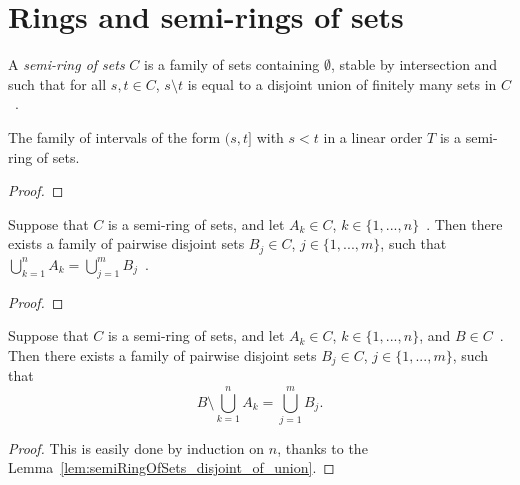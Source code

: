 \section{Rings and semi-rings of sets}

\begin{definition}\label{def:semiRingOfSets}
  \mathlibok
  A \emph{semi-ring of sets} $C$ is a family of sets containing $\emptyset$,
  stable by intersection and such that for all $s, t \in C$,
  $s \setminus t$ is equal to a disjoint union of finitely many sets in $C$~.
\end{definition}

\begin{lemma}\label{lem:semiRingOfSets_of_intervals}
  \mathlibok
  The family of intervals of the form $(s, t]$
  with $s < t$ in a linear order $T$ is a semi-ring of sets.
\end{lemma}

\begin{proof}\leanok
\end{proof}

\begin{lemma}\label{lem:semiRingOfSets_disjoint_of_union}
  \mathlibok
  Suppose that $C$ is a semi-ring of sets, and let $A_k \in C$, $k \in \{1, ..., n\}$~.
  Then there exists a family of pairwise disjoint sets $B_j \in C$, $j \in \{1, ..., m\}$,
  such that $\bigcup_{k=1}^n A_k = \bigcup_{j=1}^m B_j$~.
\end{lemma}

\begin{proof}\leanok
\end{proof}

\begin{corollary}\label{cor:semiRingOfSets_subtractUnion}
  \mathlibok
  Suppose that $C$ is a semi-ring of sets, and let
  $A_k \in C$, $k \in \{1, ..., n\}$, and $B\in C$~.
  Then there exists a family of pairwise disjoint sets $B_j \in C$, $j \in \{1, ..., m\}$,
  such that
  \[
    B\setminus\bigcup_{k=1}^n A_k = \bigcup_{j=1}^m B_j.
  \]
\end{corollary}

\begin{proof}\leanok
This is easily done by induction on $n$, thanks to the Lemma~\ref{lem:semiRingOfSets_disjoint_of_union}.
\end{proof}

